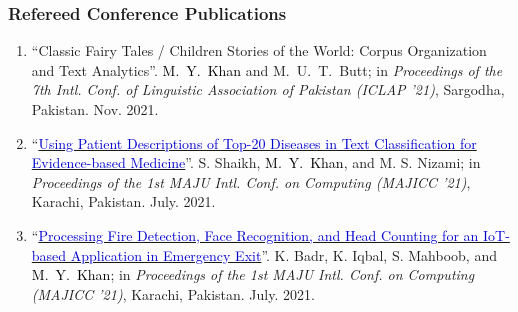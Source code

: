 \documentclass[a4paper, 10pt]{article}
\begin{document}
\subsubsection*{{Refereed Conference Publications}}
\begin{enumerate}[C\arabic*.] 
\itemsep = 0em






\item ``Classic Fairy Tales / Children Stories of the World: Corpus Organization and Text Analytics''. \textcolor{Black}{M.~Y.~Khan} and M.~U.~T.~Butt; in \emph{Proceedings of the 7th Intl. Conf. of Linguistic Association of Pakistan (ICLAP '21)}, Sargodha, Pakistan. Nov. 2021. %

\item ``\href{https://ieeexplore.ieee.org/document/9526252}{\textcolor{MediumBlue}{Using Patient Descriptions of Top-20 Diseases in Text Classification for Evidence-based Medicine}}''. S. Shaikh, \textcolor{Black}{M.~Y.~Khan}, and M. S. Nizami; in \emph{Proceedings of the 1st MAJU Intl. Conf. on Computing (MAJICC '21)}, Karachi, Pakistan. July. 2021.

\item ``\href{https://ieeexplore.ieee.org/document/9526261}{\textcolor{MediumBlue}{Processing Fire Detection, Face Recognition, and Head Counting for an IoT-based Application in Emergency Exit}}''. K. Badr, K. Iqbal, S. Mahboob, and \textcolor{Black}{M.~Y.~Khan}; in \emph{Proceedings of the 1st MAJU Intl. Conf. on Computing (MAJICC '21)}, Karachi, Pakistan. July. 2021.


\end{enumerate}
\end{document}
